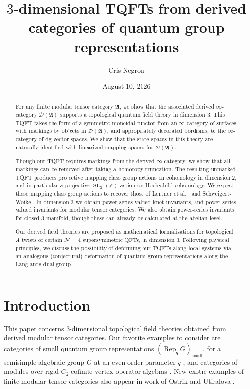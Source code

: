 \documentclass[reqno]{amsart}
\title[TQFTs from derived quantum group representations]{$3$-dimensional TQFTs from derived categories of quantum group representations}
\date{August 10, 2026}
\author{Cris Negron}
\theoremstyle{definition}
\newcommand{\mfk}[1]{\mathfrak{#1}}
\newcommand{\mbb}[1]{\mathbb{#1}}
\newcommand{\mcl}[1]{\mathcal{#1}}
\newcommand{\msc}[1]{\mathscr{#1}}
\newcommand{\opn}[1]{\operatorname{#1}}
\DeclareMathOperator{\Rep}{Rep}
\renewcommand{\1}{\mathbf{1}}
\begin{document}

\maketitle


\begin{abstract}
For any finite modular tensor category $\mfk{A}$, we show that the associated derived $\infty$-category $\msc{D}(\mfk{A})$ supports a topological quantum field theory in dimension $3$.  This TQFT takes the form of a symmetric monoidal functor from an $\infty$-category of surfaces with markings by objects in $\msc{D}(\mfk{A})$, and appropriately decorated bordisms, to the $\infty$-category of dg vector spaces.  We show that the state spaces in this theory are naturally identified with linearized mapping spaces for $\msc{D}(\mfk{A})$.
\par

Though our TQFT requires markings from the derived $\infty$-category, we show that all markings can be removed after taking a homotopy truncation.  The resulting unmarked TQFT produces projective mapping class group actions on cohomology in dimension $2$, and in particular a projective $\opn{SL}_2(\mbb{Z})$-action on Hochschild cohomology.  We expect these mapping class group actions to recover those of Lentner et al.\ \cite{lentneretal23} and Schweigert-Woike \cite{schweigertwoike21}.  In dimension $3$ we obtain power-series valued knot invariants, and power-series valued invariants for modular tensor categories.  We also obtain power-series invariants for closed $3$-manifold, though these can already be calculated at the abelian level.
\par

Our derived field theories are proposed as mathematical formalizations for topological $A$-twists of certain $\mcl{N}=4$ supersymmetric QFTs, in dimension $3$.  Following physical principles, we discuss the possibility of deforming our TQFTs along local systems via an analogous (conjectural) deformation of quantum group representations along the Langlands dual group.
\end{abstract}

\tableofcontents

\section{Introduction}

This paper concerns $3$-dimensional topological field theories obtained from derived modular tensor categories. Our favorite examples to consider are categories of small quantum group representations $(\Rep_qG)_{\opn{small}}$, for a semisimple algebraic group $G$ at an even order parameter $q$ \cite{gainutdinovlentnerohrmann,negron26}, and categories of modules over rigid $C_2$-cofinite vertex operator algebras \cite{mcrae}. New exotic examples of finite modular tensor categories also appear in work of Ostrik and Utiralova \cite{ostrikutiralova}.
\par
\end{document}

